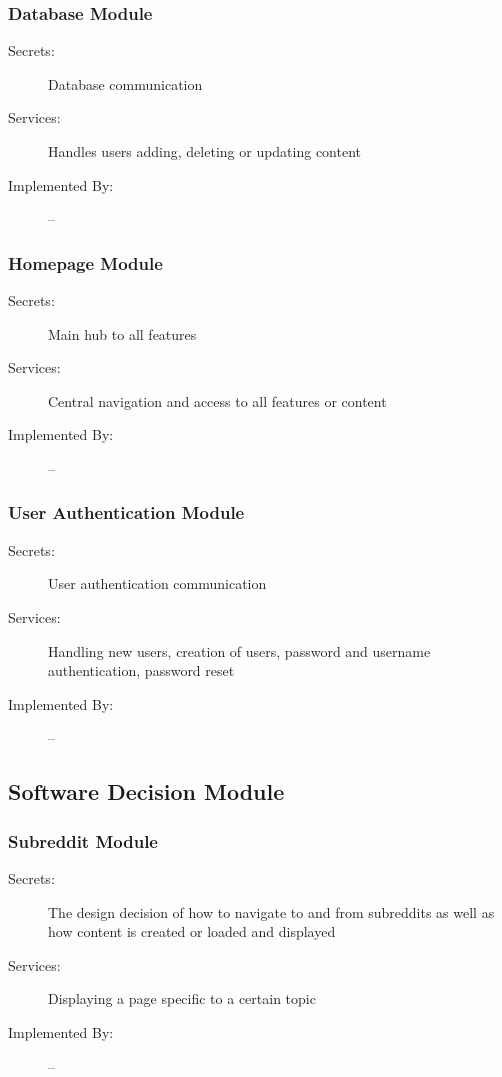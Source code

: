 \documentclass[12pt,fleqn]{article}
\begin{document}
\subsubsection{Database Module}
\begin{description}
\item[Secrets:] Database communication
\item[Services:] Handles users adding, deleting or updating content
\item[Implemented By:] --
\end{description}

\subsubsection{Homepage Module}
\begin{description}
\item[Secrets:] Main hub to all features
\item[Services:] Central navigation and access to all features or content
\item[Implemented By:] --
\end{description}

\subsubsection{User Authentication Module}
\begin{description}
\item[Secrets: ] User authentication communication
\item[Services: ] Handling new users, creation of users, password and username authentication, password reset
\item[Implemented By: ] --
\end{description}


\subsection{Software Decision Module}

\subsubsection{Subreddit Module}
\begin{description}
\item[Secrets:] The design decision of how to navigate to and from subreddits as well as how content is created or loaded and displayed
\item[Services:] Displaying a page specific to a certain topic
\item[Implemented By:] --
\end{description}
\end{document}
